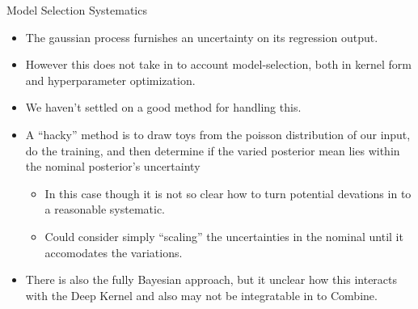 \documentclass[10pt]{beamer}
\begin{document}
\begin{frame}{Model Selection Systematics}
  \begin{itemize}
  \item The gaussian process furnishes an uncertainty on its regression output.
  \item However this does not take in to account model-selection, both in kernel form and hyperparameter optimization.
  \item We haven't settled on a good method for handling this. 
  \item A ``hacky'' method is to draw toys from the poisson distribution of our input, do the training, and then determine if the varied posterior mean lies within the nominal posterior's uncertainty
    \begin{itemize}

    \item In this case though it is not so clear how to turn potential devations in to a reasonable systematic.
    \item Could consider simply ``scaling'' the uncertainties in the nominal until it accomodates the variations.
    \end{itemize}
    
  \item There is also the fully Bayesian approach, but it unclear how this interacts with the Deep Kernel and also may not be integratable in to Combine. 
  \end{itemize}
\end{frame}


\end{document}
